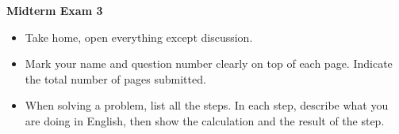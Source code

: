 \usepackage{html}

\begin{center}
{\Large \bf  Midterm Exam 3}
\end{center}

\begin{itemize}
\item Take home, open everything except discussion.
\item Mark your name and question number clearly on top of each page.
  Indicate the total number of pages submitted.
\item When solving a problem, list all the steps. In each step, describe 
  what you are doing in English, then show the calculation and the 
  result of the step. 
\end{itemize}

